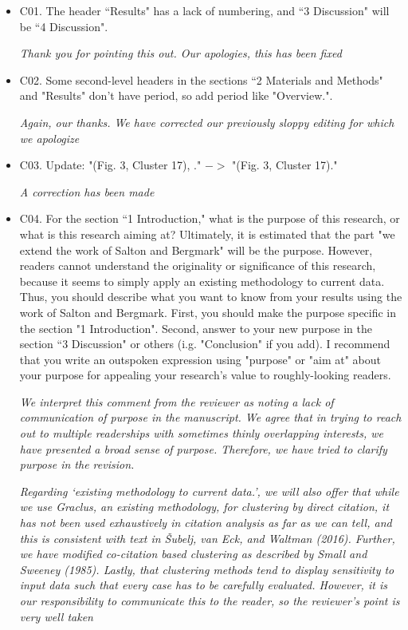 \documentclass[11pt, oneside]{article}   	%
\begin{document}
\begin{itemize}    
\item C01. The header ``Results" has a lack of numbering, and ``3 Discussion" will be ``4 Discussion".

\emph{Thank you for pointing this out. Our apologies, this has been fixed}
        
\item    C02. Some second-level headers in the sections ``2 Materials and Methods" and "Results" don't have period, so add period like "Overview.".

\emph{ Again, our thanks. We have corrected our previously sloppy editing for which we apologize} 
 
\item C03. Update: "(Fig. 3, Cluster 17), ." $->$ "(Fig. 3, Cluster 17)."
    
\emph{A correction has been made} 

\item C04. For the section ``1 Introduction," what is the purpose of this research, or what is this research aiming at? Ultimately, it is estimated that the part "we extend the work of Salton and Bergmark" will be the purpose. 
However, readers cannot understand the originality or significance of this research, because it seems to simply apply an existing methodology to current data. Thus, you should describe what you want to know from your 
results using the work of Salton and Bergmark. First, you should make the purpose specific in the section "1 Introduction". Second, answer to your new purpose in the section ``3 Discussion" or others (i.g. "Conclusion" if you add).
I recommend that you write an outspoken expression using "purpose" or "aim at" about your purpose for appealing your research's value to roughly-looking readers.

\emph{We interpret this comment from the reviewer as noting a lack of communication of purpose in the manuscript. We agree that in trying to reach out to multiple readerships with sometimes thinly overlapping interests, we have 
presented a broad sense of purpose. Therefore, we have tried to clarify purpose in the revision.} 

\emph{Regarding `existing methodology to current data.', we will also offer that while we use Graclus, an existing methodology, for clustering by direct citation, it has not been used exhaustively in citation analysis as far as we can tell, and this is consistent with text in \v{S}ubelj, van Eck, and Waltman (2016). Further, we have modified co-citation based clustering as described by Small and Sweeney (1985). Lastly, that clustering methods tend to display sensitivity to input data such that every case has to be carefully evaluated. However, it is our responsibility to communicate this to the reader, so the reviewer's point is very well taken}


\end{itemize}
\end{document}
